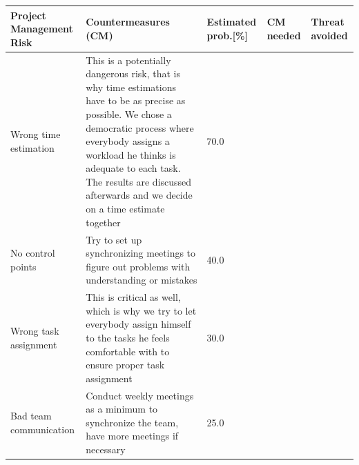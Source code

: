 \begin{center}
	\begin{footnotesize}
		\setlength{\arrayrulewidth}{1,05pt}
		\begin{tabular}[htb]{|p{2cm}|p{5cm}|p{1.5cm}|p{1cm}|p{1cm}|}
			\hline
			\textbf{Project Management Risk}& \textbf{Countermeasures (CM)} &
			\textbf{Estimated prob.[\%]} &\textbf{CM needed} & \textbf{Threat avoided} \\
			\hline
			\hline
			\rowcolor{lightgray} Wrong time estimation & This is a potentially dangerous risk, that is why time estimations have to be as precise as possible. We chose a democratic process where everybody assigns a workload he thinks is adequate to each task. The results are discussed afterwards and we decide on a time estimate together & 70.0&\xmark &\cmark\\
			\hline
			\rowcolor{lightergray} No control points & Try to set up synchronizing meetings to figure out problems with understanding or mistakes & 40.0  &\cmark &\cmark\\
			\hline
			\rowcolor{lightergray} Wrong task assignment & This is critical as well, which is why we try to let everybody assign himself to the tasks he feels comfortable with to ensure proper task assignment & 30.0 &\cmark &\cmark\\
			\hline	
			\rowcolor{lightergray} Bad team communication & Conduct weekly meetings as a minimum to synchronize the team, have more meetings if necessary & 25.0&\cmark &\cmark\\
		
			\hline
		\end{tabular}
	\end{footnotesize}
\end{center}

